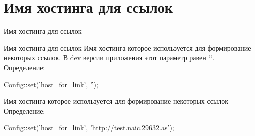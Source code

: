 \hypertarget{group__host__for__link}{\section{Имя хостинга для ссылок}
\label{group__host__for__link}
}


Имя хостинга для ссылок  


Имя хостинга для ссылок Имя хостинга которое используется для формирование некоторых ссылок. В dev версии приложения этот параметр равен \char`\"{}\char`\"{}. Определение\-: 
\begin{DoxyCode}
\hyperlink{class_config_aa485369b2925858d92e468d405bd0798}{Config::set}(\textcolor{stringliteral}{'host\_for\_link'}, \textcolor{stringliteral}{''});
\end{DoxyCode}


Имя хостинга которое используется для формирование некоторых ссылок Определение\-: 
\begin{DoxyCode}
\hyperlink{class_config_aa485369b2925858d92e468d405bd0798}{Config::set}(\textcolor{stringliteral}{'host\_for\_link'}, \textcolor{stringliteral}{'http://test.naic.29632.as'});
\end{DoxyCode}
 
